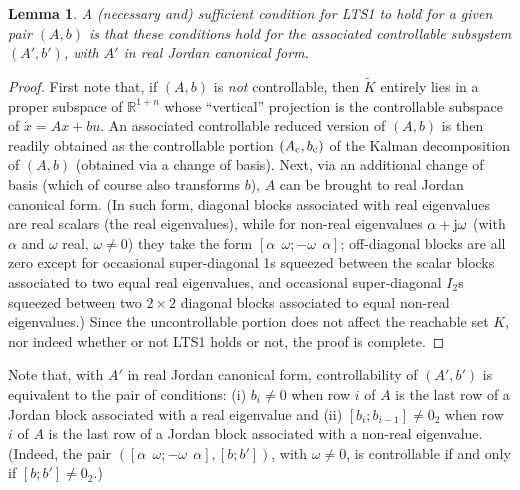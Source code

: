 \documentclass[letterpaper,10pt,conference]{ieeeconf}
\def\R{{\mathbb{R}}}
\newtheorem{lemma}{Lemma} %
\begin{document}
\begin{lemma}
\label{lem:reduced(A,b)}
A (necessary and) sufficient condition for {\rm LTS1} to hold for a
given pair $(A,b)$ is that these conditions hold for the associated 
controllable subsystem $(A',b')$, 
with $A'$ in real Jordan canonical form.
\end{lemma}
\begin{proof}
First note that, if $(A,b)$ is {\em not} controllable, then
$\tilde K$ entirely lies in a proper subspace of $\R^{1+n}$ whose ``vertical''
projection is the controllable subspace of $\dot x=Ax+bu$.  An associated
controllable reduced version of $(A,b)$ is then readily obtained as
the controllable portion $(A_{\rm c},b_{\rm c})$ of the Kalman decomposition 
of $(A,b)$ (obtained via a change of basis).  
Next, via an additional change of basis (which of course also
transforms $b$), $A$ can be brought to real Jordan canonical form.  
(In such form, diagonal blocks 
associated with real eigenvalues are real scalars (the real eigenvalues), 
while for non-real eigenvalues 
$\alpha+{\rm j}\omega$ (with $\alpha$ and $\omega$ real, $\omega\not=0$) 
they take the form $[\alpha~~\omega;-\omega~~\alpha]$;
off-diagonal blocks are all zero except for occasional super-diagonal
1s squeezed between the scalar blocks associated to 
two equal real eigenvalues, and occasional 
super-diagonal $I_2$s squeezed between two $2\times 2$ diagonal blocks
associated to equal non-real eigenvalues.)  
Since the uncontrollable portion does not affect the reachable set $K$, 
nor indeed whether or not LTS1 holds or not, the proof is complete.
\end{proof}

\noindent
Note that, with $A'$ in real Jordan canonical form, controllability
of $(A',b')$ is equivalent to the pair of conditions: (i) $b_i\not=0$ 
when row $i$ of $A$ is the last row of a Jordan block associated with 
a real eigenvalue and (ii) $[b_i;b_{i-1}]\not=0_2$ when row $i$ of $A$ 
is the last row of a Jordan block associated with a non-real eigenvalue.
(Indeed, the pair $([\alpha~~\omega;-\omega~~\alpha],[b;b'])$,
with $\omega\not=0$, is controllable if and only if $[b;b']\not=0_2.$)
\end{document}
